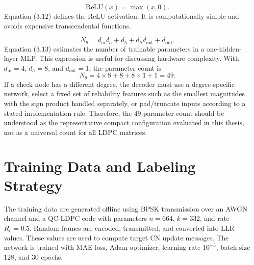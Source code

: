 \begin{equation}
\mathrm{ReLU}(x)=\max(x,0).
\end{equation}
Equation (3.12) defines the ReLU activation. It is computationally simple and avoids expensive transcendental functions.

\begin{equation}
N_{\theta}=d_{\mathrm{in}}d_h+d_h+d_hd_{\mathrm{out}}+d_{\mathrm{out}}.
\end{equation}
Equation (3.13) estimates the number of trainable parameters in a one-hidden-layer MLP. This expression is useful for discussing hardware complexity. With $d_{\mathrm{in}}=4$, $d_h=8$, and $d_{\mathrm{out}}=1$, the parameter count is
\begin{equation*}
N_{\theta}=4\times 8+8+8\times 1+1=49.
\end{equation*}
If a check node has a different degree, the decoder must use a degree-specific network, select a fixed set of reliability features such as the smallest magnitudes with the sign product handled separately, or pad/truncate inputs according to a stated implementation rule. Therefore, the 49-parameter count should be understood as the representative compact configuration evaluated in this thesis, not as a universal count for all LDPC matrices.

\section{Training Data and Labeling Strategy}
The training data are generated offline using BPSK transmission over an AWGN channel and a QC-LDPC code with parameters $n=664$, $k=332$, and rate $R_c=0.5$. Random frames are encoded, transmitted, and converted into LLR values. These values are used to compute target CN update messages. The network is trained with MAE loss, Adam optimizer, learning rate $10^{-3}$, batch size 128, and 30 epochs.

